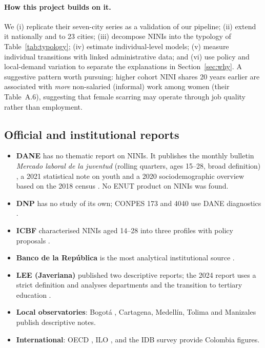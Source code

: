 \documentclass[11pt]{article}
\begin{document}
\paragraph{How this project builds on it.} We (i) replicate their seven-city series as a validation of our pipeline; (ii) extend it nationally and to 23 cities; (iii) decompose NINIs into the typology of Table~\ref{tab:typology}; (iv) estimate individual-level models; (v) measure individual transitions with linked administrative data; and (vi) use policy and local-demand variation to separate the explanations in Section~\ref{sec:why}. A suggestive pattern worth pursuing: higher cohort NINI shares 20 years earlier are associated with \emph{more} non-salaried (informal) work among women (their Table~A.6), suggesting that female scarring may operate through job quality rather than employment.

\subsection{Official and institutional reports}

\begin{itemize}
\item \textbf{DANE} has no thematic report on NINIs. It publishes the monthly bulletin \textit{Mercado laboral de la juventud} (rolling quarters, ages 15--28, broad definition) \citep{dane2026}, a 2021 statistical note on youth \citep{dane2021} and a 2020 sociodemographic overview based on the 2018 census \citep{dane2020}. No ENUT product on NINIs was found.
\item \textbf{DNP} has no study of its own; CONPES 173 and 4040 use DANE diagnostics \citep{conpes173,conpes4040}.
\item \textbf{ICBF} characterised NINIs aged 14--28 into three profiles with policy proposals \citep{icbf}.
\item \textbf{Banco de la Rep\'ublica} is the most analytical institutional source \citep{lasso2026,otero2026}.
\item \textbf{LEE (Javeriana)} published two descriptive reports; the 2024 report uses a strict definition and analyses departments and the transition to tertiary education \citep{lee60,lee99}.
\item \textbf{Local observatories}: Bogot\'a \citep{ode2024}, Cartagena, Medell\'in, Tolima and Manizales publish descriptive notes.
\item \textbf{International}: OECD \citep{oecd2022,oecdgender}, ILO \citep{ilo2024col}, and the IDB survey \citep{novella2018} provide Colombia figures.
\end{itemize}
\end{document}
